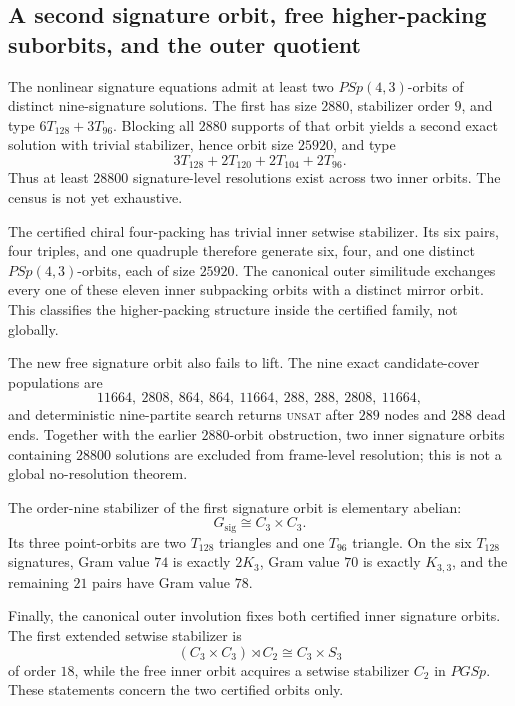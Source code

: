 \subsection{A second signature orbit, free higher-packing suborbits, and the outer quotient}

The nonlinear signature equations admit at least two $PSp(4,3)$-orbits of distinct nine-signature solutions.  The first has size $2880$, stabilizer order $9$, and type $6T_{128}+3T_{96}$.  Blocking all $2880$ supports of that orbit yields a second exact solution with trivial stabilizer, hence orbit size $25920$, and type
\[
3T_{128}+2T_{120}+2T_{104}+2T_{96}.
\]
Thus at least $28800$ signature-level resolutions exist across two inner orbits.  The census is not yet exhaustive.

The certified chiral four-packing has trivial inner setwise stabilizer.  Its six pairs, four triples, and one quadruple therefore generate six, four, and one distinct $PSp(4,3)$-orbits, each of size $25920$.  The canonical outer similitude exchanges every one of these eleven inner subpacking orbits with a distinct mirror orbit.  This classifies the higher-packing structure inside the certified family, not globally.

The new free signature orbit also fails to lift.  The nine exact candidate-cover populations are
\[
11664,\ 2808,\ 864,\ 864,\ 11664,\ 288,\ 288,\ 2808,\ 11664,
\]
and deterministic nine-partite search returns \textsc{unsat} after $289$ nodes and $288$ dead ends.  Together with the earlier $2880$-orbit obstruction, two inner signature orbits containing $28800$ solutions are excluded from frame-level resolution; this is not a global no-resolution theorem.

The order-nine stabilizer of the first signature orbit is elementary abelian:
\[
G_{\mathrm{sig}}\cong C_3\times C_3.
\]
Its three point-orbits are two $T_{128}$ triangles and one $T_{96}$ triangle.  On the six $T_{128}$ signatures, Gram value $74$ is exactly $2K_3$, Gram value $70$ is exactly $K_{3,3}$, and the remaining $21$ pairs have Gram value $78$.

Finally, the canonical outer involution fixes both certified inner signature orbits.  The first extended setwise stabilizer is
\[
(C_3\times C_3)\rtimes C_2\cong C_3\times S_3
\]
of order $18$, while the free inner orbit acquires a setwise stabilizer $C_2$ in $PGSp$.  These statements concern the two certified orbits only.
